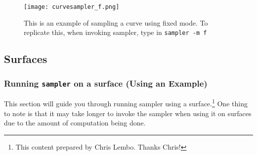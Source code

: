 \begin{figure}[H]
\centering
\texttt{[image: curvesampler\_f.png]}
\caption{This is an example of sampling a curve using fixed mode. To replicate this, when invoking sampler, type in {\tt sampler -m f}}
\end{figure}

\subsection{Surfaces}
\label{sec:sampler_surface}

\subsubsection{Running {\tt sampler} on a surface (Using an Example)}

This section will guide you through running sampler using a surface.\footnote{This content prepared by Chris Lembo.  Thanks Chris!}
 One thing to note is that it may take longer to invoke the sampler when using it on surfaces due to the amount of computation being done.

